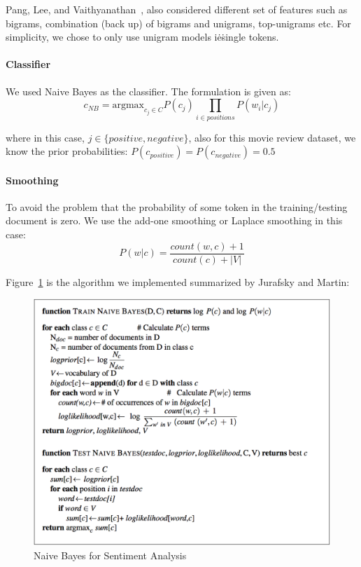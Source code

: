Pang, Lee, and
Vaithyanathan~\cite{hid-sp18-405-sentiment-pang2002thumbs}, also
considered different set of features such as bigrams, combination
(back up) of bigrams and unigrams, top-unigrams etc. For simplicity,
we chose to only use unigram models i\.e\. single tokens.

\paragraph{Classifier}
We  used Naive Bayes as the classifier. The formulation is given as:
\begin{equation}\label{eq:nb}
c_{NB}=\text{argmax}_{c_j \in C} P(c_j) \prod_{i \in positions} P(w_i|c_j)
\end{equation}

where in this case, $j \in \{positive, negative\}$, also for this
movie review dataset, we know the prior probabilities:
$P(c_{positive})=P(c_{negative})=0.5$

\paragraph{Smoothing}
To avoid the problem that the probability of some token in the 
training/testing document is zero. We use the add-one smoothing or Laplace 
smoothing in this case:
\begin{equation}\label{eq:sm}
P(w|c) = \frac{count(w,c) + 1}{count(c) + |V|}
\end{equation}

Figure~\ref{f:algo} is the algorithm we implemented summarized by Jurafsky 
and Martin:
\begin{figure}[!ht]
		\centering\includegraphics[width=\columnwidth]{images/algorithm.png}
		\caption{Naive Bayes for Sentiment 
		Analysis~\cite{hid-sp18-405-sentiment-jurafsky2009}}\label{f:algo}
\end{figure}

